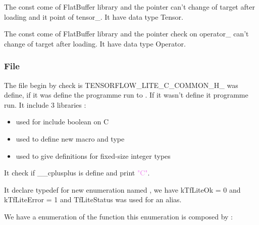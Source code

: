 The const  come of FlatBuffer library and the pointer can't change of  target after loading and it point of tensor\_. It have data type Tensor. 

The const  come of FlatBuffer library and the pointer check on operator\_ can't change of  target after loading. It have data type Operator. 

\begin{center}
    \label{Figure:MicroErrorRep}
\end{center}

\subsubsection{File }

The file begin by check is TENSORFLOW\_LITE\_C\_COMMON\_H\_ was define, if it was define the programme run to . If it wasn't define it programme run. It include 3 libraries : 

\begin{itemize}
    \item {} used for include boolean on C
    \item {} used to define new macro and type 
    \item {} used to  give definitions for fixed-size integer types
\end{itemize}

It check if \_\_cplusplus is define and print \textcolor{violet}{"C"}.

It declare typedef  for new enumeration named ,  we have kTfLiteOk = 0 and kTfLiteError = 1 and TfLiteStatus was used for an alias. 

\begin{center}
    \label{Figure:Comatibily}
\end{center}

We have a enumeration of the function
 this enumeration is composed by : 

